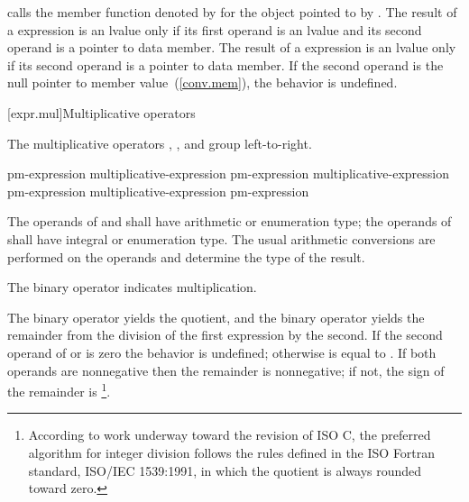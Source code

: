 calls the member function denoted by  for the object
pointed to by .
\exitexample 
The result of a  expression is an lvalue only if its first
operand is an lvalue and its second operand is a pointer to data member.
The result of a \tcode{->*} expression is an lvalue only if its second
operand is a pointer to data member. If the second operand is the null
pointer to member value~(\ref{conv.mem}), the behavior is undefined.

[expr.mul]{Multiplicative operators}%
%

\pnum
The multiplicative operators \tcode{*}, \tcode{/}, and \tcode{\%} group
left-to-right.

%
%
%
%
%
%
%
%
\begin{bnf}
\br
    pm-expression\br
    multiplicative-expression \terminal{*} pm-expression\br
    multiplicative-expression \terminal{/} pm-expression\br
    multiplicative-expression \terminal{\%} pm-expression
\end{bnf}

\pnum
The operands of \tcode{*} and \tcode{/} shall have arithmetic or
enumeration type; the operands of \tcode{\%} shall have integral or
enumeration type. The usual arithmetic conversions are performed on the
operands and determine the type of the result.

\pnum
The binary \tcode{*} operator indicates multiplication.

\pnum
The binary \tcode{/} operator yields the quotient, and the binary
\tcode{\%} operator yields the remainder from the division of the first
expression by the second.
%
If the second operand of \tcode{/} or \tcode{\%} is zero the behavior is
undefined; otherwise  is equal to .
If both operands are nonnegative then the remainder is nonnegative; if
not, the sign of the remainder is
\footnote{According to work underway
toward the revision of ISO C, the preferred algorithm for integer
division follows the rules defined in the ISO Fortran standard,
ISO/IEC 1539:1991, in which the quotient is always rounded toward zero.}.

